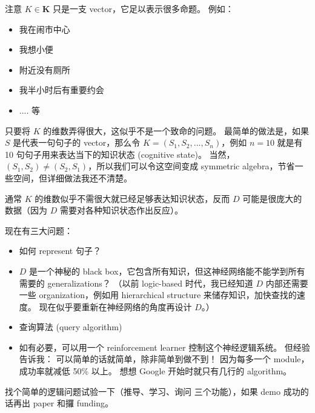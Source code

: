 \documentclass[12pt]{article}
\begin{document}
注意 $K \in \mathbf{K}$ 只是一支 vector，它足以表示很多命题。 例如：
\begin{itemize}
\item 我在闹市中心
\item 我想小便
\item 附近没有厕所
\item 我半小时后有重要约会
\item .... 等
\end{itemize}
只要将 $K$ 的维数弄得很大，这似乎不是一个致命的问题。 最简单的做法是，如果 $S$ 是代表一句句子的 vector，那么令 $K = (S_1, S_2, ..., S_n)$，例如 $n=10$ 就是有 10 句句子用来表达当下的知识状态 (cognitive state)。 当然，$(S_1,S_2) \neq (S_2,S_1)$，所以我们可以令这空间变成 symmetric algebra，节省一些空间，但详细做法我还不清楚。

通常 $K$ 的维数似乎不需很大就已经足够表达知识状态，反而 $D$ 可能是很庞大的数据（因为 $D$ 需要对各种知识状态作出反应）。

现在有三大问题：
\begin{itemize}
\item 如何 represent 句子？
\item $D$ 是一个神秘的 black box，它包含所有知识，但这神经网络能不能学到所有需要的 generalizations？ （以前 logic-based 时代，我已经知道 $D$ 内部还需要一些 organization，例如用 hierarchical structure 来储存知识，加快查找的速度。 现在似乎要重新在神经网络的角度再设计 $D$。）
\item 查询算法 (query algorithm)
\item 如有必要，可以用一个 reinforcement learner 控制这个神经逻辑系统。 但经验告诉我： 可以简单的话就简单，除非简单到做不到！  因为每多一个 module，成功率就减低 50\% 以上。 想想 Google 开始时就只有几行的 algorithm。 
\end{itemize}

找个简单的逻辑问题试验一下（推导、学习、询问 三个功能），如果 demo 成功的话再出 paper 和攞 funding。 
\end{document}
